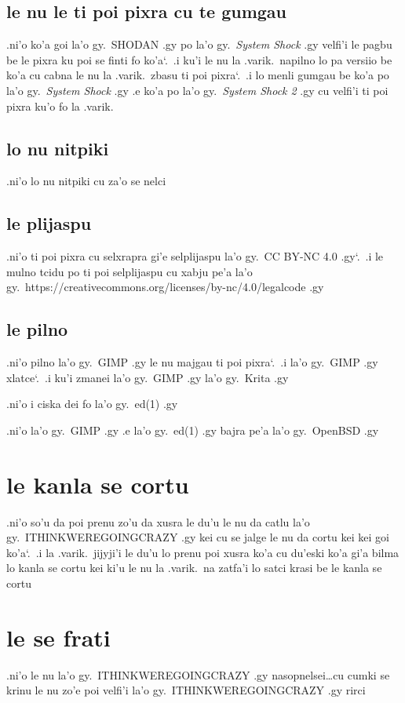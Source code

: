 \documentclass{report}
\newcommand\sds{\spacefactor\sfcode`.\ \space}
\begin{document}
\subsection{le nu le ti poi pixra cu te gumgau}
.ni'o ko'a goi la'o gy.\ SHODAN .gy po la'o gy.\ \textit{System Shock} .gy velfi'i le pagbu be le pixra ku poi se finti fo ko'a\sds  .i ku'i le nu la .varik.\ napilno lo pa versiio be ko'a cu cabna le nu la .varik.\ zbasu ti poi pixra\sds  .i lo menli gumgau be ko'a po la'o gy.\ \textit{System Shock} .gy .e ko'a po la'o gy.\ \textit{System Shock 2} .gy cu velfi'i ti poi pixra ku'o fo la .varik.
\subsection{lo nu nitpiki}
.ni'o lo nu nitpiki cu za'o se nelci

\subsection{le plijaspu}
.ni'o ti poi pixra cu selxrapra gi'e selplijaspu la'o gy.\ CC BY-NC 4.0 .gy\sds  .i le mulno tcidu po ti poi selplijaspu cu xabju pe'a la'o gy.\ https://creativecommons.org/licenses/by-nc/4.0/legalcode .gy

\subsection{le pilno}
.ni'o pilno la'o gy.\ GIMP .gy le nu majgau ti poi pixra\sds  .i  la'o gy.\ GIMP .gy xlatce\sds  .i ku'i zmanei la'o gy.\ GIMP .gy la'o gy.\ Krita .gy

.ni'o i ciska dei fo la'o gy.\ ed(1) .gy

.ni'o la'o gy.\ GIMP .gy .e la'o gy.\ ed(1) .gy bajra pe'a la'o gy.\ OpenBSD .gy

\section{le kanla se cortu}
.ni'o so'u da poi prenu zo'u da xusra le du'u le nu da catlu la'o gy.\ ITHINKWEREGOINGCRAZY .gy kei cu se jalge le nu da cortu kei kei goi ko'a\sds  .i la .varik.\ jijyji'i le du'u lo prenu poi xusra ko'a cu du'eski ko'a gi'a bilma lo kanla se cortu kei ki'u le nu la .varik.\ na zatfa'i lo satci krasi be le kanla se cortu

\section{le se frati}
.ni'o le nu la'o gy.\ ITHINKWEREGOINGCRAZY .gy nasopnelsei\ldots cu cumki se krinu le nu zo'e poi velfi'i la'o gy.\ ITHINKWEREGOINGCRAZY .gy rirci
\end{document}

